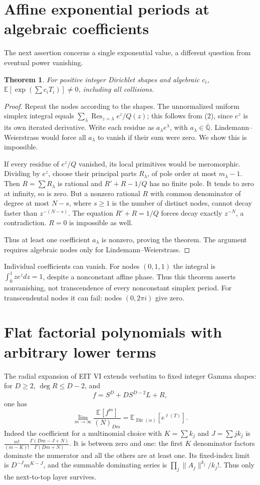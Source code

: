 \documentclass[11pt]{article}
\newtheorem{theorem}{Theorem}
\newcommand{\Qb}{\overline{\mathbb Q}}
\DeclareMathOperator{\Res}{Res}
\begin{document}
\section{Affine exponential periods at algebraic coefficients}
The next assertion concerns a single exponential value, a different
question from eventual power vanishing.
\begin{theorem}\label{thm:exp}
For positive integer Dirichlet shapes and algebraic $c_i$,
$\mathbb E[\exp(\sum c_iT_i)]\ne0$, including all collisions.
\end{theorem}
\begin{proof}
Repeat the nodes according to the shapes. The unnormalized uniform
simplex integral equals $\sum_\lambda\Res_{z=\lambda}e^z/Q(z)$;
this follows from (2), since $e^z$ is its own iterated derivative.
Write each residue as $a_\lambda e^\lambda$, with $a_\lambda\in\Qb$.
Lindemann--Weierstrass would force all $a_\lambda$ to vanish if their sum
were zero. We show this is impossible.

If every residue of $e^z/Q$ vanished, its local primitives would be
meromorphic. Dividing by $e^z$, choose their principal parts $R_\lambda$,
of pole order at most $m_\lambda-1$. Then $R=\sum R_\lambda$ is rational
and $R'+R-1/Q$ has no finite pole. It tends to zero at infinity, so is
zero. But a nonzero rational $R$ with common denominator of degree at most
$N-s$, where $s\ge1$ is the number of distinct nodes, cannot decay faster
than $z^{-(N-s)}$. The equation $R'+R=1/Q$ forces decay exactly $z^{-N}$,
a contradiction. $R=0$ is impossible as well.

Thus at least one coefficient $a_\lambda$ is nonzero, proving the theorem.
The argument requires algebraic nodes only for Lindemann--Weierstrass.
\end{proof}
Individual coefficients can vanish. For nodes $(0,1,1)$ the integral is
$\int_0^1 z e^z dz=1$, despite a nonconstant affine phase. Thus this theorem
asserts nonvanishing, not transcendence of every nonconstant simplex period.
For transcendental nodes it can fail: nodes $(0,2\pi i)$ give zero.

\section{Flat factorial polynomials with arbitrary lower terms}
The radial expansion of EIT VI extends verbatim to fixed integer Gamma
shapes: for $D\ge2$, $\deg R\le D-2$, and
\[
 f=S^D+D S^{D-2}L+R,
\]
one has
\[
 \lim_{m\to\infty}\frac{\mathbb E[f^m]}{(N)_{Dm}}
       =\mathbb E_{\operatorname{Dir}(\alpha)}[e^{\ell(T)}]. \tag{8}
\]
Indeed the coefficient for a multinomial choice with $K=\sum k_j$ and
$J=\sum jk_j$ is
$\frac{m!}{(m-K)!}\frac{\Gamma(Dm-J+N)}{\Gamma(Dm+N)}$.
It is between zero and one: the first $K$ denominator factors dominate
the numerator and all the others are at least one. Its fixed-index limit
is $D^{-J}m^{K-J}$, and the summable dominating series is
$\prod_j\|A_j\|^{k_j}/k_j!$. Thus only the next-to-top layer survives.
\end{document}

